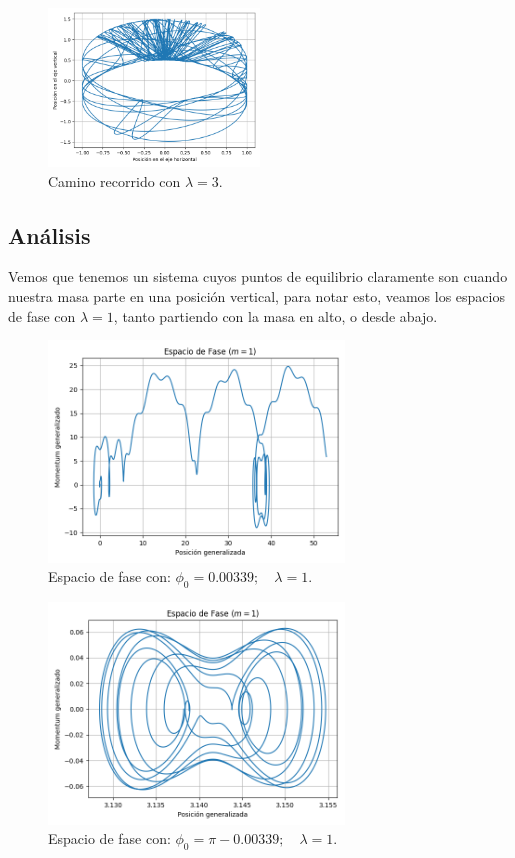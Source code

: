\documentclass[letter, 11pt]{article}
\begin{document}
\begin{figure}[h!]
 \centering
 \includegraphics[width=0.5\textwidth]{./imagenes/img6.png}
 \caption{Camino recorrido con $\lambda = 3$.}
\end{figure}

\newpage

\subsection{Análisis}
Vemos que tenemos un sistema cuyos puntos de equilibrio claramente son cuando nuestra masa parte en una posición vertical, para notar esto, veamos los espacios de fase con $\lambda=1$, tanto partiendo con la masa en alto, o desde abajo.


\begin{figure}[h!]
 \centering
 \includegraphics[width=0.7\textwidth]{./imagenes/img1_phase.png}
 \caption{Espacio de fase con:  $\phi_0=0.00339; \quad \lambda = 1$.}
\end{figure}



\begin{figure}[h!]
 \centering
 \includegraphics[width=0.7\textwidth]{./imagenes/img4_phase.png}
 \caption{Espacio de fase con:  $\phi_0=\pi-0.00339; \quad \lambda = 1$.}
\end{figure}
\end{document}
